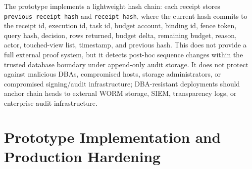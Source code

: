 \documentclass[journal]{IEEEtran}
\begin{document}
The prototype implements a lightweight hash chain: each receipt stores
\texttt{previous\_receipt\_hash} and
\texttt{receipt\_hash}, where the current hash commits to the receipt
id, execution id, task id, budget account, binding id, fence token, query hash,
decision, rows returned, budget delta, remaining budget, reason, actor,
touched-view list, timestamp, and previous hash. This
does not provide a full external proof system, but it detects post-hoc
sequence changes within the trusted database boundary under append-only
audit storage. It does not protect against malicious DBAs, compromised
hosts, storage administrators, or compromised signing/audit
infrastructure; DBA-resistant deployments should anchor chain heads to
external WORM storage, SIEM, transparency logs, or enterprise audit
infrastructure.


\hypertarget{prototype-implementation-and-production-hardening}{%
\section{Prototype Implementation and Production
Hardening}\label{prototype-implementation-and-production-hardening}}
\end{document}
